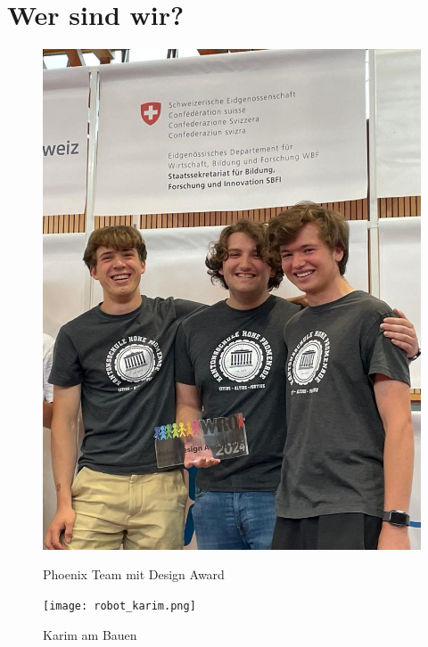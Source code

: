\documentclass[11pt]{article}
\begin{document}
    \section*{Wer sind wir?}
    \begin{center}
        \begin{minipage}{\linewidth}
            \begin{figure}[H]
                \centering
                \begin{minipage}{0.31\linewidth}
                    \centering
                    \includegraphics[width=.9\linewidth]{./team}
                    \caption*{\centering Phoenix Team mit Design Award}
                \end{minipage}%
                \begin{minipage}{.1\linewidth}
                \end{minipage}%
                \begin{minipage}{.59\linewidth}
                    \texttt{[image: robot\_karim.png]}
                    \caption*{\centering \hspace{-1cm} Karim am Bauen}
                \end{minipage}
            \end{figure}
        \end{minipage}
    \end{center}
\end{document}
